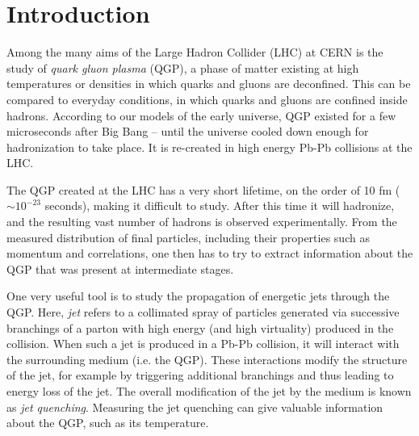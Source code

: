 \documentclass[a4paper,12pt]{article}
\numberwithin{equation}{section}
\begin{document}

\maketitle
\newpage
{}
\section{Introduction}


Among the many aims of the Large Hadron Collider (LHC) at CERN is the study of \emph{quark gluon plasma} (QGP), a phase of matter existing at high temperatures or densities in which quarks and gluons are deconfined. This can be compared to everyday conditions, in which quarks and gluons are confined inside hadrons. According to our models of the early universe, QGP existed for a few microseconds after Big Bang -- until the universe cooled down enough for hadronization to take place. It is re-created in high energy Pb-Pb collisions at the LHC.


The QGP created at the LHC has a very short lifetime, on the order of 10 fm ($\sim 10^{-23}$ seconds), making it difficult to study. After this time it will hadronize, and the resulting vast number of hadrons is observed experimentally. From the measured distribution of final particles, including their properties such as momentum and correlations, one then has to try to extract information about the QGP that was present at intermediate stages. 


One very useful tool is to study the propagation of energetic jets through the QGP. Here, \emph{jet} refers to a collimated spray of particles generated via successive branchings of a parton with high energy (and high virtuality) produced in the collision. When such a jet is produced in a Pb-Pb collision, it will interact with the surrounding medium (i.e. the QGP). These interactions modify the structure of the jet, for example by triggering additional branchings and thus leading to energy loss of the jet. The overall modification of the jet by the medium is known as \emph{jet quenching}. Measuring the jet quenching can give valuable information about the QGP, such as its temperature. 
\end{document}

